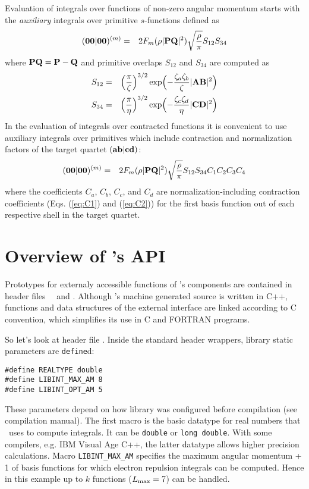 \documentclass[12pt]{article}
\begin{document}
Evaluation of integrals over functions of non-zero angular momentum starts with the
{\em auxiliary} integrals over primitive $s$-functions
defined as
\begin{eqnarray}
({\bf 00}|{\bf 00})^{(m)} & = & 2 F_m(\rho |{\bf PQ}|^2) \sqrt{\frac{\rho}{\pi}}S_{12}S_{34}
\end{eqnarray}
where ${\bf PQ} = {\bf P} - {\bf Q}$ and primitive overlaps $S_{12}$ and $S_{34}$
are computed as
\begin{eqnarray}
S_{12} & = & \Bigl( \frac{\pi}{\zeta} \Bigr)^{3/2}
\exp \Bigl(-\frac{\zeta_a\zeta_b}{\zeta} |{\bf AB}|^2 \Bigr) \\
S_{34} & = & \Bigl( \frac{\pi}{\eta} \Bigr)^{3/2}
\exp \Bigl(-\frac{\zeta_c\zeta_d}{\eta} |{\bf CD}|^2 \Bigr)
\end{eqnarray}
In the evaluation of integrals over contracted functions it is convenient to
use auxiliary integrals over primitives which include contraction and normalization factors of the
target quartet $({\bf ab}|{\bf cd})$:
\begin{eqnarray} \label{eq:0000m}
({\bf 00}|{\bf 00})^{(m)} & = &  2 F_m(\rho |{\bf PQ}|^2) \sqrt{\frac{\rho}{\pi}}S_{12}S_{34}
C_1 C_2 C_3 C_4
\end{eqnarray}
where the coefficients $C_a$, $C_b$, $C_c$, and $C_d$ are
normalization-including contraction coefficients (Eqs. (\ref{eq:C1})
and (\ref{eq:C2})) for the first basis function out of each respective shell
in the target quartet.

\section{Overview of \LIBINT 's API}

Prototypes for externaly accessible functions of \LIBINT's components are contained
in header files \libinth\, \libderivh\, and \librijh . Although \LIBINT's
machine generated source is written in C++, functions and data structures of
the external interface are linked according to C convention, which simplifies
its use in C and FORTRAN programs.

So let's look at header file \libinth. Inside the standard header wrappers,
library static parameters are {\tt define}d:
\begin{verbatim}
#define REALTYPE double
#define LIBINT_MAX_AM 8
#define LIBINT_OPT_AM 5
\end{verbatim}
These parameters depend on how library was configured before compilation (see compilation manual).
The first macro is the basic datatype for real numbers that \LIBINT\ uses
to compute integrals. It can be {\tt double} or {\tt long double}. With some compilers, e.g.
IBM Visual Age C++, the latter datatype allows higher precision calculations.
Macro {\tt LIBINT\_MAX\_AM} specifies the
maximum angular momentum + 1 of basis functions for which
electron repulsion integrals can be computed. Hence in this example up to $k$ functions ($L_{\rm max}=7$)
can be handled.
\end{document}
